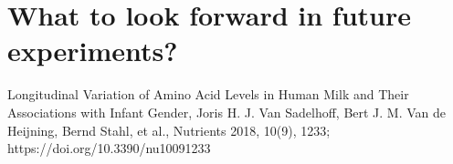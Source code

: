 \documentclass[12pt]{article}
\begin{document}
\pagebreak

\part{What to look forward in future experiments?}

\newpage



\begin{thebibliography}{1}

 Longitudinal Variation of Amino Acid Levels in Human Milk and Their Associations with Infant Gender, Joris H. J. Van Sadelhoff, Bert J. M. Van de Heijning, Bernd Stahl, et al., Nutrients 2018, 10(9), 1233; https://doi.org/10.3390/nu10091233


\end{thebibliography}
\end{document}
